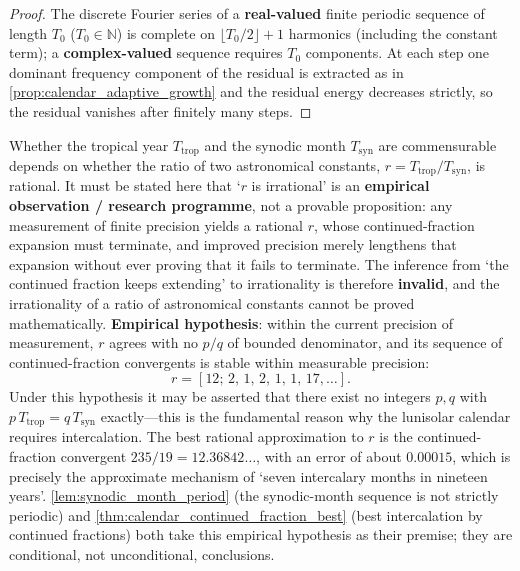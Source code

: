 \begin{proof}
The discrete Fourier series of a \textbf{real-valued} finite periodic sequence of length $T_0$ ($T_0\in\mathbb N$) is complete on $\lfloor T_0/2\rfloor+1$ harmonics (including the constant term); a \textbf{complex-valued} sequence requires $T_0$ components. At each step one dominant frequency component of the residual is extracted as in \cref{prop:calendar_adaptive_growth} and the residual energy decreases strictly, so the residual vanishes after finitely many steps.
\end{proof}

\begin{remark}\label{prop:length_incommensurability}
Whether the tropical year \(T_{\text{trop}}\) and the synodic month \(T_{\text{syn}}\) are commensurable depends on whether the ratio of two astronomical constants, \(r=T_{\text{trop}}/T_{\text{syn}}\), is rational. It must be stated here that `\(r\) is irrational' is an \textbf{empirical observation / research programme}, not a provable proposition: any measurement of finite precision yields a rational \(r\), whose continued-fraction expansion must terminate, and improved precision merely lengthens that expansion without ever proving that it fails to terminate. The inference from `the continued fraction keeps extending' to irrationality is therefore \textbf{invalid}, and the irrationality of a ratio of astronomical constants cannot be proved mathematically.
\textbf{Empirical hypothesis}: within the current precision of measurement, \(r\) agrees with no \(p/q\) of bounded denominator, and its sequence of continued-fraction convergents is stable within measurable precision:
\[
r=[12;\,2,\,1,\,2,\,1,\,1,\,17,\ldots].
\]
Under this hypothesis it may be asserted that there exist no integers \(p,q\) with \(p\,T_{\text{trop}}=q\,T_{\text{syn}}\) exactly---this is the fundamental reason why the lunisolar calendar requires intercalation. The best rational approximation to \(r\) is the continued-fraction convergent \(235/19=12.36842\ldots\), with an error of about \(0.00015\), which is precisely the approximate mechanism of `seven intercalary months in nineteen years'.
\cref{lem:synodic_month_period} (the synodic-month sequence is not strictly periodic) and \cref{thm:calendar_continued_fraction_best} (best intercalation by continued fractions) both take this empirical hypothesis as their premise; they are conditional, not unconditional, conclusions.
\end{remark}

